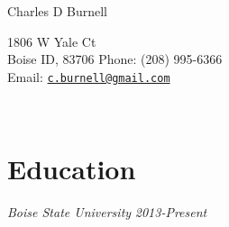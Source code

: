 \documentclass[letterpaper]{article}
\def\name{Charles D Burnell}
\def\goal{My goal is to be a software engineer to use my knowledge of math and statistics to develop new software tools using formal mathematics.}
\begin{document}
{\huge \name}
\vspace{.05in}\hline{}\vspace{.05in}
\vspace{.05in}\vspace{.05in}
\begin{multicols}{2}
1806 W Yale Ct \\
Boise ID, 83706
\vfill
\columnbreak
Phone: (208) 995-6366\\
Email:  \href{mailto:c.burnell@gmail.com}{\tt c.burnell@gmail.com}
\end{multicols}

\vspace{.05in}\\
\section*{Education}
\begin{multicols}{2}
\textit{Boise State University}
\vfill
\columnbreak
\textit{2013-Present}
\end{multicols}

\end{document}
